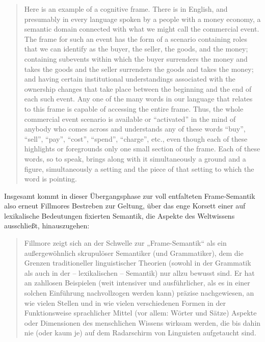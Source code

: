 \begin{quote}
Here is an example of a cognitive frame. There is in English, and presumably in every language spoken by a people with a money economy, a semantic domain connected with what we might call the commercial event. The frame for such an event has the form of a scenario containing roles that we can identify as the buyer, the seller, the goods, and the money; containing subevents within which the buyer surrenders the money and takes the goods and the seller surrenders the goods and takes the money; and having certain institutional understandings associated with the ownership changes that take place between the beginning and the end of each such event. Any one of the many words in our language that relates to this frame is capable of accessing the entire frame. Thus, the whole commercial event scenario is available or ``activated'' in the mind of anybody who comes across and understands any of these words ``buy'', ``sell'', ``pay'', ``cost'', ``spend'', ``charge'', etc., even though each of these highlights or foregrounds only one small section of the frame. Each of these words, so to speak, brings along with it simultaneously a ground and a figure, simultaneously a setting and the piece of that setting to which the word is pointing. \autocite[25]{fillmoreFrameSemanticsNature1976}
\end{quote}

Insgesamt kommt in dieser Übergangsphase zur voll entfalteten Frame-Semantik also erneut Fillmores Bestreben zur Geltung, über das enge Korsett einer auf lexikalische Bedeutungen fixierten Semantik, die Aspekte des Weltwissens ausschließt, hinauszugehen:

\begin{quote}
Fillmore zeigt sich an der Schwelle zur „Frame-Semantik`` als ein außergewöhnlich skrupulöser Semantiker (und Grammatiker), dem die Grenzen traditioneller linguistischer Theorien (sowohl in der Grammatik als auch in der -- lexikalischen -- Semantik) nur allzu bewusst sind. Er hat an zahllosen Beispielen (weit intensiver und ausführlicher, als es in einer solchen Einführung nachvollzogen werden kann) präzise nachgewiesen, an wie vielen Stellen und in wie vielen verschiedenen Formen in der Funktionsweise sprachlicher Mittel (vor allem: Wörter und Sätze) Aspekte oder Dimensionen des menschlichen Wissens wirksam werden, die bis dahin nie (oder kaum je) auf dem Radarschirm von Linguisten aufgetaucht sind. \autocite[53]{busseFrameSemantikKompendium2012}
\end{quote}

